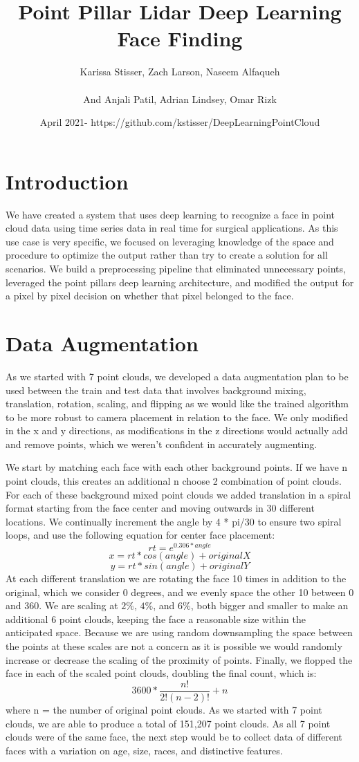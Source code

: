 \documentclass{article}
\title{Point Pillar Lidar Deep Learning Face Finding}
\author{Karissa Stisser, Zach Larson, Naseem Alfaqueh\\
\\And
Anjali Patil, Adrian Lindsey, Omar Rizk }
\date{April 2021- https://github.com/kstisser/DeepLearningPointCloud}
\begin{document}
\maketitle

\section{Introduction}
We have created a system that uses deep learning to recognize a face in point cloud data using time series data in real time for surgical applications. As this use case is very specific, we focused on leveraging knowledge of the space and procedure to optimize the output rather than try to create a solution for all scenarios. We build a preprocessing pipeline that eliminated unnecessary points, leveraged the point pillars deep learning architecture\cite{pointpillars}, and modified the output for a pixel by pixel decision on whether that pixel belonged to the face. 
\section{Data Augmentation}
As we started with 7 point clouds, we developed a data augmentation plan to be used between the train and test data that involves background mixing, translation, rotation, scaling, and flipping as we would like the trained algorithm to be more robust to camera placement in relation to the face. We only modified in the x and y directions, as modifications in the z directions would actually add and remove points, which we weren't confident in accurately augmenting. 

We start by matching each face with each other background points. If we have n point clouds, this creates an additional n choose 2 combination of point clouds. 
For each of these background mixed point clouds we added translation in a spiral format starting from the face center and moving outwards in 30 different locations. We continually increment the angle by 4 * pi/30 to ensure two spiral loops, and use the following equation for center face placement:
\[rt = e^{0.306*angle}\]
\[x = rt * cos(angle) + originalX\]
\[y = rt * sin(angle) + originalY\]
At each different translation we are rotating the face 10 times in addition to the original, which we consider 0 degrees, and we evenly space the other 10 between 0 and 360. We are scaling at ${2\%}$, ${4\%}$, and ${6\%}$, both bigger and smaller to make an additional 6 point clouds, keeping the face a reasonable size within the anticipated space. Because we are using random downsampling the space between the points at these scales are not a concern as it is possible we would randomly increase or decrease the scaling of the proximity of points. 
Finally, we flopped the face in each of the scaled point clouds, doubling the final count, which is:
\[
    3600 * \frac{n!}{2!(n-2)!} + n
\]
where n = the number of original point clouds. As we started with 7 point clouds, we are able to produce a total of 151,207 point clouds. As all 7 point clouds were of the same face, the next step would be to collect data of different faces with a variation on age, size, races, and distinctive features. 
\end{document}
